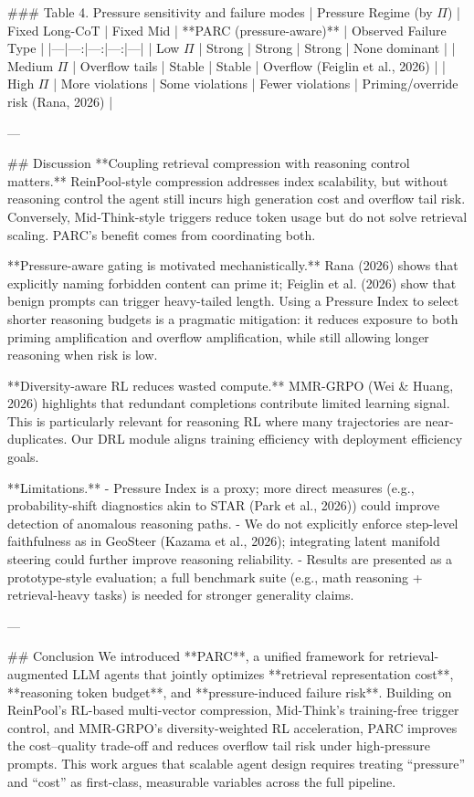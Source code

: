 ### Table 4. Pressure sensitivity and failure modes  
| Pressure Regime (by \( \Pi \)) | Fixed Long-CoT | Fixed Mid | **PARC (pressure-aware)** | Observed Failure Type |
|---|---:|---:|---:|---|
| Low \( \Pi \) | Strong | Strong | Strong | None dominant |
| Medium \( \Pi \) | Overflow tails | Stable | Stable | Overflow (Feiglin et al., 2026) |
| High \( \Pi \) | More violations | Some violations | Fewer violations | Priming/override risk (Rana, 2026) |

---

## Discussion  
**Coupling retrieval compression with reasoning control matters.** ReinPool-style compression addresses index scalability, but without reasoning control the agent still incurs high generation cost and overflow tail risk. Conversely, Mid-Think-style triggers reduce token usage but do not solve retrieval scaling. PARC’s benefit comes from coordinating both.

**Pressure-aware gating is motivated mechanistically.** Rana (2026) shows that explicitly naming forbidden content can prime it; Feiglin et al. (2026) show that benign prompts can trigger heavy-tailed length. Using a Pressure Index to select shorter reasoning budgets is a pragmatic mitigation: it reduces exposure to both priming amplification and overflow amplification, while still allowing longer reasoning when risk is low.

**Diversity-aware RL reduces wasted compute.** MMR-GRPO (Wei & Huang, 2026) highlights that redundant completions contribute limited learning signal. This is particularly relevant for reasoning RL where many trajectories are near-duplicates. Our DRL module aligns training efficiency with deployment efficiency goals.

**Limitations.**  
- Pressure Index is a proxy; more direct measures (e.g., probability-shift diagnostics akin to STAR (Park et al., 2026)) could improve detection of anomalous reasoning paths.  
- We do not explicitly enforce step-level faithfulness as in GeoSteer (Kazama et al., 2026); integrating latent manifold steering could further improve reasoning reliability.  
- Results are presented as a prototype-style evaluation; a full benchmark suite (e.g., math reasoning + retrieval-heavy tasks) is needed for stronger generality claims.

---

## Conclusion  
We introduced **PARC**, a unified framework for retrieval-augmented LLM agents that jointly optimizes **retrieval representation cost**, **reasoning token budget**, and **pressure-induced failure risk**. Building on ReinPool’s RL-based multi-vector compression, Mid-Think’s training-free trigger control, and MMR-GRPO’s diversity-weighted RL acceleration, PARC improves the cost–quality trade-off and reduces overflow tail risk under high-pressure prompts. This work argues that scalable agent design requires treating “pressure” and “cost” as first-class, measurable variables across the full pipeline.

